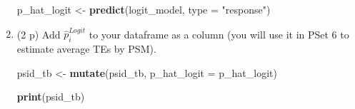 \documentclass[
]{article}
\newenvironment{Shaded}{\begin{snugshade}}{\end{snugshade}}
\newcommand{\AttributeTok}[1]{\textcolor[rgb]{0.13,0.29,0.53}{#1}}
\newcommand{\FunctionTok}[1]{\textcolor[rgb]{0.13,0.29,0.53}{\textbf{#1}}}
\newcommand{\NormalTok}[1]{#1}
\newcommand{\OtherTok}[1]{\textcolor[rgb]{0.56,0.35,0.01}{#1}}
\newcommand{\StringTok}[1]{\textcolor[rgb]{0.31,0.60,0.02}{#1}}
\begin{document}
\begin{enumerate}
\begin{Shaded}
\begin{Highlighting}[]
\NormalTok{p\_hat\_logit }\OtherTok{\textless{}{-}} \FunctionTok{predict}\NormalTok{(logit\_model, }\AttributeTok{type =} \StringTok{"response"}\NormalTok{)}
\end{Highlighting}
\end{Shaded}
\item
  (2 p) Add \(\hat{p}_i^{Logit}\) to your dataframe as a column (you
  will use it in PSet 6 to estimate average TEs by PSM).

\begin{Shaded}
\begin{Highlighting}[]
\NormalTok{psid\_tb }\OtherTok{\textless{}{-}} \FunctionTok{mutate}\NormalTok{(psid\_tb, }\AttributeTok{p\_hat\_logit =}\NormalTok{ p\_hat\_logit)}
\end{Highlighting}
\end{Shaded}

\begin{Shaded}
\begin{Highlighting}[]
\FunctionTok{print}\NormalTok{(psid\_tb)}
\end{Highlighting}
\end{Shaded}


\end{enumerate}
\end{document}
